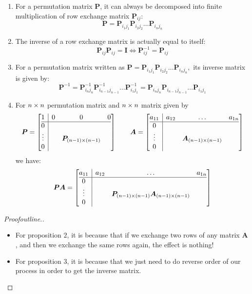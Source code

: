 \begin{proposition}
\begin{enumerate}
\item
For a permutation matrix $\bm P$, it can always be decomposed into finite multiplication of row
exchange matrix $\bm P_{ij}$:
\[
\bm P=\bm P_{i_1j_1}\bm P_{i_2j_2}\ldots\bm P_{i_nj_n}
\]
\item
The inverse of a row exchange matrix is actually equal to itself:
\[
\bm P_{ij}\bm P_{ij}=\bm I
\Longleftrightarrow
\bm P_{ij}^{-1}=\bm P_{ij}
\]
\item
For a permutation matrix written as $\bm P=\bm P_{i_1j_1}\bm P_{i_2j_2}\ldots\bm P_{i_nj_n},$ its inverse matrix is given by:
\[
\bm P^{-1}=\bm P_{i_nj_n}^{-1}\bm P_{i_{n-1}j_{n-1}}^{-1}\ldots\bm P_{i_1j_1}^{-1}
=\bm P_{i_nj_n}\bm P_{i_{n-1}j_{n-1}}\ldots\bm P_{i_1j_1}
\]
\item
For $n\times n$ permutation matrix and $n\times n$ matrix given by
\[
\bm P=\left[\begin{array}{@{}c|ccc@{}}
1&0&0&0\\
\hline
0&&&\\
\vdots&&\bm P_{(n-1)\x(n-1)}&\\
0&&&
\end{array}\right]\qquad
\bm A=\left[\begin{array}{@{}c|ccc@{}}
a_{11}&a_{12}&\dots&a_{1n}\\
\hline
0&&&\\
\vdots&&\bm A_{(n-1)\x(n-1)}&\\
0&&&
\end{array}\right]
\]
we have:
\[
\bm P\bm A=\left[\begin{array}{@{}c|ccc@{}}
a_{11}&a_{12}&\dots&a_{1n}\\
\hline
0&&&\\
\vdots&&\bm P_{(n-1)\x(n-1)}\bm A_{(n-1)\x(n-1)}&\\
0&&&
\end{array}\right]
\]
\end{enumerate}
\end{proposition}
\begin{proof}[Proofoutline.]\qquad\\
\begin{itemize}
\item
For proposition $2$, it is because that if we exchange two rows of any matrix $\bm A$, and then we
exchange the same rows again, the effect is nothing!
\item
For proposition 3, it is because that we just need to do reverse order of our process in order to
get the inverse matrix.
\end{itemize}
\end{proof}
